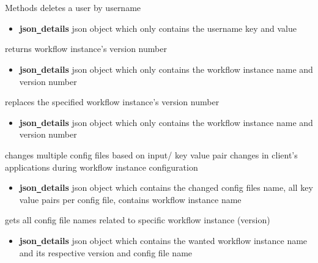 \begin{methodenv}{Methods}
deletes a user by username
\begin{itemize}
        \item \textbf{json\texttt{\_}details}
        json object which only contains the username key and value
\end{itemize}


returns workflow instance's version number 
\begin{itemize}
        \item \textbf{json\texttt{\_}details}
        json object which only contains the workflow instance name and version number 
\end{itemize}

replaces the specified workflow instance's version number 
\begin{itemize}
        \item \textbf{json\texttt{\_}details}
        json object which only contains the workflow instance name and version number
\end{itemize}


changes multiple config files based on input/ key value pair changes in client's applications during workflow instance 
configuration
\begin{itemize}
        \item \textbf{json\texttt{\_}details}
        json object which contains the changed config files name, 
        all key value pairs per config file, 
        contains workflow instance name
\end{itemize}

gets all config file names related to specific workflow instance (version)
\begin{itemize}
        \item \textbf{json\texttt{\_}details}
        json object which contains the wanted workflow instance name and its respective version and config file name
\end{itemize}



\end{methodenv}

